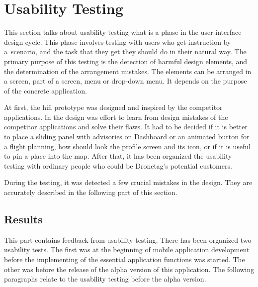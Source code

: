 \section{Usability Testing}\label{sec:usability-testing}

This section talks about usability testing what is a phase in the user interface design cycle.
This phase involves testing with users who get instruction by a~scenario, and the task that they get they should do in their natural way.
The primary purpose of this testing is the detection of harmful design elements, and the determination of the arrangement mistakes.
The elements can be arranged in a screen, part of a screen, menu or drop-down menu.
It depends on the purpose of the concrete application.

At first, the \acrshort{hifi} prototype was designed and inspired by the competitor applications.
In the design was effort to learn from design mistakes of the competitor applications and solve their flaws.
It had to be decided if it is better to place a sliding panel with advisories on Dashboard or an animated button for a flight planning, how should look the profile screen and its icon, or if it is useful to pin a place into the map.
After that, it has been organized the usability testing with ordinary people who could be Dronetag's potential customers.

During the testing, it was detected a few crucial mistakes in the design.
They are accurately described in the following part of this section.

\subsection{Results}\label{subsec:results}
This part contains feedback from usability testing.
There has been organized two usability tests.
The first was at the beginning of mobile application development before the implementing of the essential application functions was started.
The other was before the release of the alpha version of this application.
The following paragraphs relate to the usability testing before the alpha version.


